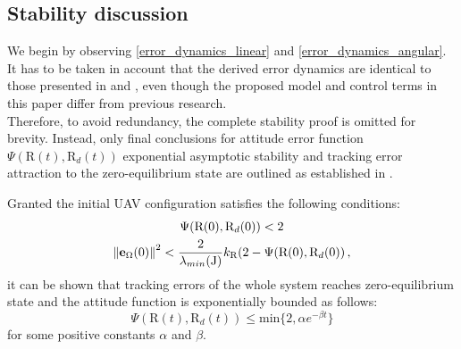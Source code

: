 \subsection{Stability discussion}

We begin by observing \eqref{error_dynamics_linear} and \eqref{error_dynamics_angular}. 
It has to be taken in account that the derived error dynamics are identical to those presented in \cite{LeeClanak1} and \cite{LeeClanak4}, even though the proposed model and control terms in this paper differ from previous research. \\
Therefore, to avoid redundancy, the complete stability proof is omitted for brevity. Instead, only final conclusions for attitude error function $\Psi (\text{R}(t), \text{R}_d(t))$ exponential asymptotic stability and tracking error attraction to the zero-equilibrium state are outlined as established in \cite{LeeClanak1}.

Granted the initial UAV configuration satisfies the following conditions:
\begin{gather}
	\Psi (\text{R}(0), \text{R}_d(0)) < 2 \\
	\left\lVert\textbf{e}_\Omega(0)\right\rVert^2 < \frac{2}{\lambda_{min}(\text{J})}k_\text{R}(2 - \Psi(\text{R}(0), \text{R}_d(0)) \, ,
\end{gather}
it can be shown that tracking errors of the whole system reaches zero-equilibrium state and the attitude function is exponentially bounded as follows:
\begin{equation}
	\Psi(\text{R}(t), \text{R}_d(t)) \leq \text{min}\{2, \alpha e^{-\beta t} \}
\end{equation}
for some positive constants $\alpha$ and $\beta$.